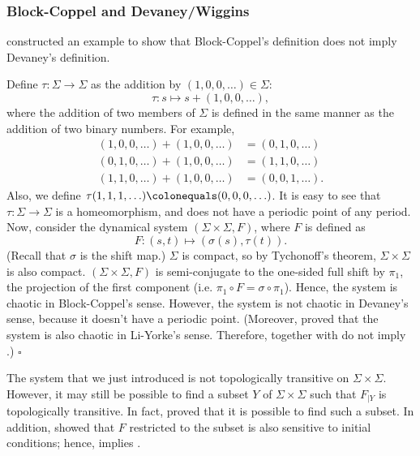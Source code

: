 \documentclass[12pt,twoside,draft]{book}
\begin{document}
\subsubsection*{Block-Coppel and Devaney/Wiggins}
\citet{aulbach} constructed an example to show that Block-Coppel's definition does not imply Devaney's definition.
\begin{example}
  \citep{aulbach} 
  Define $\tau: \Sigma \to \Sigma$ as the addition by $(1, 0, 0, \ldots) \in \Sigma$:
  \begin{equation*}
    \tau: s \mapsto s + (1, 0, 0, \ldots),
  \end{equation*}
  where the addition of two members of $\Sigma$ is defined in the same manner as the addition of two binary numbers.
  For example, 
  \begin{align*}
    (1, 0, 0, \ldots) + (1, 0, 0, \ldots) &= (0, 1, 0, \ldots) \\
    (0, 1, 0, \ldots) + (1, 0, 0, \ldots) &= (1, 1, 0, \ldots) \\
    (1, 1, 0, \ldots) + (1, 0, 0, \ldots) &= (0, 0, 1, \ldots).
  \end{align*}
  Also, we define $\tau(1,1,1, \ldots) \ceq (0,0,0, \ldots)$.
  It is easy to see that $\tau: \Sigma \to \Sigma$ is a homeomorphism, and does not have a periodic point of any period.
  Now, consider the dynamical system $(\Sigma \times \Sigma, F)$, where $F$ is defined as
  \begin{equation*}
    F: (s, t) \mapsto (\sigma(s), \tau(t)).
  \end{equation*}
  (Recall that $\sigma$ is the shift map.)
  $\Sigma$ is compact, so by Tychonoff's theorem, $\Sigma \times \Sigma$ is also compact.
  $(\Sigma \times \Sigma, F)$ is semi-conjugate to the one-sided full shift by $\pi_1$, the projection of the first component (i.e. $\pi_1 \circ F = \sigma \circ \pi_1$).
  Hence, the system is chaotic in Block-Coppel's sense.
  However, the system is not chaotic in Devaney's sense, because it doesn't have a periodic point.
  (Moreover, \citet{blockcoppel} proved that the system is also chaotic in Li-Yorke's sense.
  Therefore, \blcp together with \liy do not imply \dev.)
  $\square$
\end{example}
The system that we just introduced is not topologically transitive on $\Sigma \times \Sigma$.
However, it may still be possible to find a subset $Y$ of $\Sigma \times \Sigma$ such that $F_{|Y}$ is topologically transitive.
In fact, \citet{auslander} proved that it is possible to find such a subset.
In addition, \citet{auslander} showed that $F$ restricted to the subset is also sensitive to initial conditions; hence, \blcp implies \wig.
\end{document}

